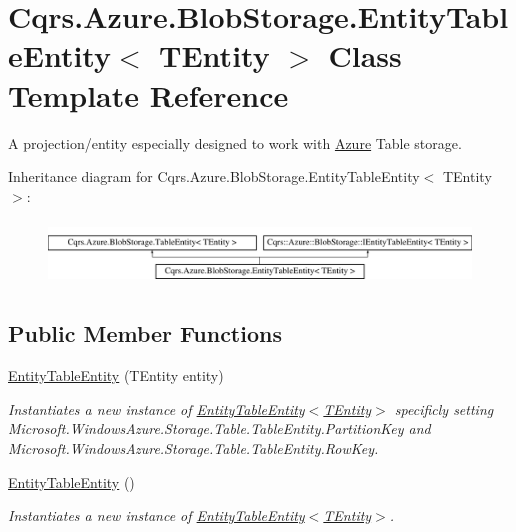 \hypertarget{classCqrs_1_1Azure_1_1BlobStorage_1_1EntityTableEntity}{}\section{Cqrs.\+Azure.\+Blob\+Storage.\+Entity\+Table\+Entity$<$ T\+Entity $>$ Class Template Reference}
\label{classCqrs_1_1Azure_1_1BlobStorage_1_1EntityTableEntity}


A projection/entity especially designed to work with \hyperlink{namespaceCqrs_1_1Azure}{Azure} Table storage.  


Inheritance diagram for Cqrs.\+Azure.\+Blob\+Storage.\+Entity\+Table\+Entity$<$ T\+Entity $>$\+:\begin{figure}[H]
\begin{center}
\leavevmode
\includegraphics[height=1.723077cm]{classCqrs_1_1Azure_1_1BlobStorage_1_1EntityTableEntity}
\end{center}
\end{figure}
\subsection*{Public Member Functions}
\begin{DoxyCompactItemize}
\item 
\hyperlink{classCqrs_1_1Azure_1_1BlobStorage_1_1EntityTableEntity_a8d3f730147f5f9b37faeea0840db6a64_a8d3f730147f5f9b37faeea0840db6a64}{Entity\+Table\+Entity} (T\+Entity entity)
\begin{DoxyCompactList}\small\item\em Instantiates a new instance of \hyperlink{classCqrs_1_1Azure_1_1BlobStorage_1_1EntityTableEntity_a8d3f730147f5f9b37faeea0840db6a64_a8d3f730147f5f9b37faeea0840db6a64}{Entity\+Table\+Entity$<$\+T\+Entity$>$} specificly setting Microsoft.\+Windows\+Azure.\+Storage.\+Table.\+Table\+Entity.\+Partition\+Key and Microsoft.\+Windows\+Azure.\+Storage.\+Table.\+Table\+Entity.\+Row\+Key. \end{DoxyCompactList}\item 
\hyperlink{classCqrs_1_1Azure_1_1BlobStorage_1_1EntityTableEntity_a8a41f6e4ad55a23f9ea68e675ea52c9b_a8a41f6e4ad55a23f9ea68e675ea52c9b}{Entity\+Table\+Entity} ()
\begin{DoxyCompactList}\small\item\em Instantiates a new instance of \hyperlink{classCqrs_1_1Azure_1_1BlobStorage_1_1EntityTableEntity_a8d3f730147f5f9b37faeea0840db6a64_a8d3f730147f5f9b37faeea0840db6a64}{Entity\+Table\+Entity$<$\+T\+Entity$>$}. \end{DoxyCompactList}\end{DoxyCompactItemize}
